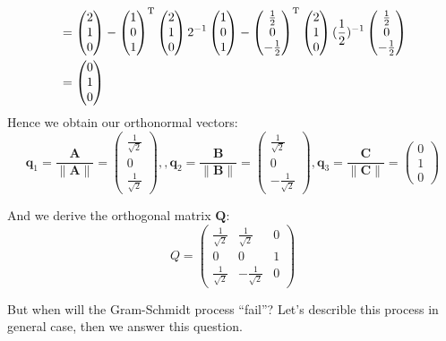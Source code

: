 \begin{example}
\begin{itemize}
\[\begin{aligned}
&=\begin{pmatrix}
2\\1\\0
\end{pmatrix}-\begin{pmatrix}
1\\0\\1
\end{pmatrix}^{\mathrm T}\begin{pmatrix}
2\\1\\0
\end{pmatrix}2^{-1}\begin{pmatrix}
1\\0\\1
\end{pmatrix}-\begin{pmatrix}
\frac{1}{2}\\0\\-\frac{1}{2}
\end{pmatrix}^{\mathrm T}\begin{pmatrix}
2\\1\\0
\end{pmatrix}(\frac{1}{2})^{-1}\begin{pmatrix}
\frac{1}{2}\\0\\-\frac{1}{2}
\end{pmatrix}\\
&=\begin{pmatrix}
0\\1\\0
\end{pmatrix}
\end{aligned}
\]
Hence we obtain our orthonormal vectors:
\[
\bm q_1=\frac{\bm A}{\|\bm A\|}
=\begin{pmatrix}
\frac{1}{\sqrt 2}\\0\\\frac{1}{\sqrt 2}
\end{pmatrix},
,\bm q_2=\frac{\bm B}{\|\bm B\|}
=\begin{pmatrix}
\frac{1}{\sqrt 2}\\0\\-\frac{1}{\sqrt 2}
\end{pmatrix}
,\bm q_3=\frac{\bm C}{\|\bm C\|}
=\begin{pmatrix}
0\\1\\0
\end{pmatrix}
\]
\end{itemize}
And we derive the orthogonal matrix $\bm Q$:
\[
Q=\begin{pmatrix}
\frac{1}{\sqrt 2}&\frac{1}{\sqrt 2}&0\\0&0&1\\
\frac{1}{\sqrt 2}&-\frac{1}{\sqrt 2}&0
\end{pmatrix}
\]
\end{example}
But when will the Gram-Schmidt process ``fail''? Let's describle this process in general case, then we answer this question.\\
